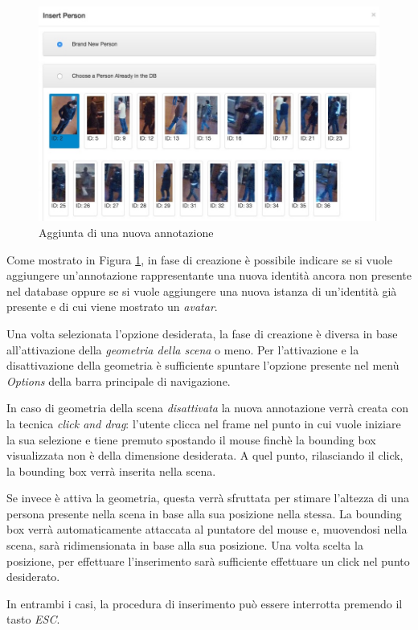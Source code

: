 \begin{figure}[h]
\centering
\includegraphics[width=0.8\linewidth]{images/add-person.jpg}
  \caption{Aggiunta di una nuova annotazione}
  \label{fig:addperson}
\end{figure}

Come mostrato in Figura \ref{fig:addperson}, in fase di creazione è possibile indicare se si vuole aggiungere un'annotazione rappresentante una nuova identità ancora non presente nel database oppure se si vuole aggiungere una nuova istanza di un'identità già presente e di cui viene mostrato un \emph{avatar}.

Una volta selezionata l'opzione desiderata, la fase di creazione è diversa in base all'attivazione della \emph{geometria della scena} o meno. Per l'attivazione e la disattivazione della geometria è sufficiente spuntare l'opzione presente nel menù \emph{Options} della barra principale di navigazione.

In caso di geometria della scena \emph{disattivata} la nuova annotazione verrà creata con la tecnica \emph{click and drag}: l'utente clicca nel frame nel punto in cui vuole iniziare la sua selezione e tiene premuto spostando il mouse finchè la bounding box visualizzata non è della dimensione desiderata. A quel punto, rilasciando il click, la bounding box verrà inserita nella scena.

Se invece è attiva la geometria, questa verrà sfruttata per stimare l'altezza di una persona presente nella scena in base alla sua posizione nella stessa. La bounding box verrà automaticamente attaccata al puntatore del mouse e, muovendosi nella scena, sarà ridimensionata in base alla sua posizione. Una volta scelta la posizione, per effettuare l'inserimento sarà sufficiente effettuare un click nel punto desiderato. 

In entrambi i casi, la procedura di inserimento può essere interrotta premendo il tasto \emph{ESC}.

